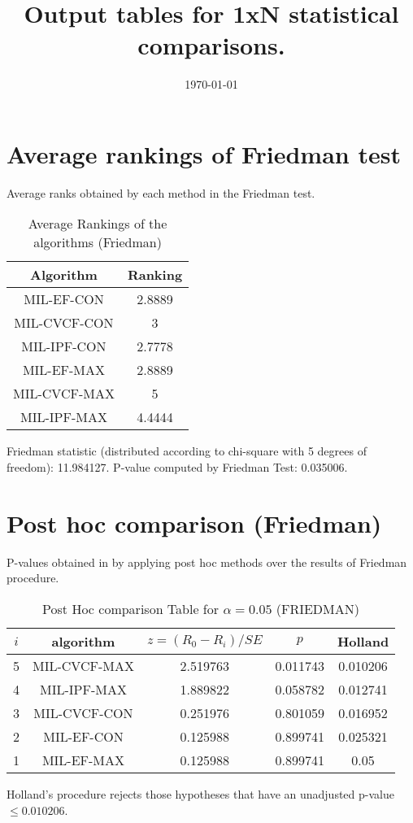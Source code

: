 \documentclass[a4paper,10pt]{article}
\title{Output tables for 1xN statistical comparisons.}
\author{}
\date{\today}
\begin{document}
\begin{landscape}
\pagestyle{empty}
\maketitle
\thispagestyle{empty}

\section{Average rankings of Friedman test}


Average ranks obtained by each method in the Friedman test.

\begin{table}[!htp]
\centering
\begin{tabular}{|c|c|}\hline
Algorithm&Ranking\\\hline
MIL-EF-CON&2.8889\\MIL-CVCF-CON&3\\MIL-IPF-CON&2.7778\\MIL-EF-MAX&2.8889\\MIL-CVCF-MAX&5\\MIL-IPF-MAX&4.4444\\\hline\end{tabular}
\caption{Average Rankings of the algorithms (Friedman)}
\end{table}

Friedman statistic (distributed according to chi-square with 5 degrees of freedom): 11.984127. \newline P-value computed by Friedman Test: 0.035006.\newline


\newpage

\section{Post hoc comparison (Friedman)}


P-values obtained in by applying post hoc methods over the results of Friedman procedure.

\begin{table}[!htp]
\centering\footnotesize
\begin{tabular}{ccccc}
$i$&algorithm&$z=(R_0 - R_i)/SE$&$p$&Holland\\
\hline5&MIL-CVCF-MAX&2.519763&0.011743&0.010206\\4&MIL-IPF-MAX&1.889822&0.058782&0.012741\\3&MIL-CVCF-CON&0.251976&0.801059&0.016952\\2&MIL-EF-CON&0.125988&0.899741&0.025321\\1&MIL-EF-MAX&0.125988&0.899741&0.05\\\hline
\end{tabular}
\caption{Post Hoc comparison Table for $\alpha=0.05$ (FRIEDMAN)}
\end{table}Holland's procedure rejects those hypotheses that have an unadjusted p-value $\le0.010206$.



\end{landscape}
\end{document}
